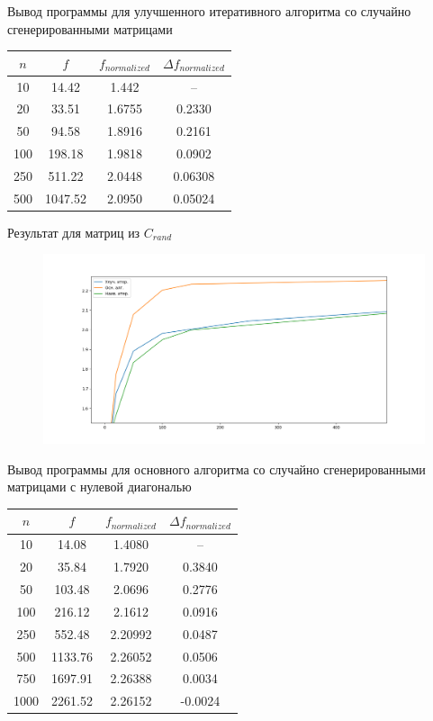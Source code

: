 \documentclass[12pt]{beamer}
\begin{document}
\begin{frame}{Вывод программы для улучшенного итеративного алгоритма со случайно сгенерированными матрицами}
\begin{tabular}{|c|c|c|c|}
\hline $n$ & $f$ & $f_{normalized}$ & $\Delta f_{normalized}$ \\
\hline 10 & 14.42 & 1.442 & -- \\
\hline 20 & 33.51 & 1.6755 & 0.2330 \\
\hline 50 & 94.58 & 1.8916 & 0.2161 \\
\hline 100 & 198.18 & 1.9818 & 0.0902 \\
\hline 250 & 511.22 & 2.0448 & 0.06308 \\
\hline 500 & 1047.52 & 2.0950 & 0.05024 \\
\hline
\end{tabular}
\end{frame}

\begin{frame}{Результат для матриц из $C_{rand}$}
\begin{figure}
\includegraphics[width=\textwidth]{random_compare.png}
\end{figure}
\end{frame}

\begin{frame}{Вывод программы для основного алгоритма со случайно сгенерированными матрицами с нулевой диагональю}
\label{aglo_rid}
\begin{tabular}{|c|c|c|c|}
\hline $n$ & $f$ & $f_{normalized}$  & $\Delta f_{normalized}$\\
\hline 10 & 14.08 & 1.4080 & -- \\
\hline 20 & 35.84 & 1.7920 & 0.3840 \\
\hline 50 & 103.48 & 2.0696 & 0.2776 \\
\hline 100 & 216.12 & 2.1612 & 0.0916 \\
\hline 250 & 552.48 & 2.20992 & 0.0487 \\
\hline 500 & 1133.76 & 2.26052 & 0.0506 \\
\hline 750 & 1697.91 & 2.26388 & 0.0034 \\
\hline 1000 & 2261.52 & 2.26152 & -0.0024 \\
\hline
\end{tabular}
\end{frame}
\end{document}
